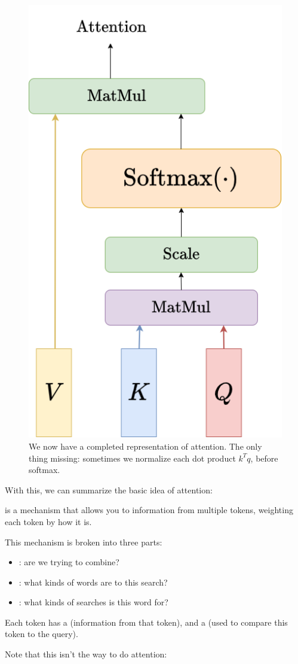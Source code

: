         \begin{figure}[H]
            \centering
            \includegraphics[width=0.3\linewidth]{images/transformers_images/condensed_attention.png}
            \caption*{We now have a completed representation of attention. The only thing missing: sometimes we normalize each dot product $k^T q$, before softmax.}
        \end{figure}

        With this, we can summarize the basic idea of attention:\\

        \begin{concept}
             is a mechanism that allows you to  information from multiple tokens, weighting each token by how  it is.

            This mechanism is broken into three parts:

            \begin{itemize}
                \item {}:  are we trying to combine?

                \item {}: what kinds of words are  to this search?

                \item {}: what kinds of searches is this word  for?
            \end{itemize}

            Each token has a  (information from that token), and a  (used to compare this token to the query).
        \end{concept}

        Note that this isn't the  way to do attention:\\

